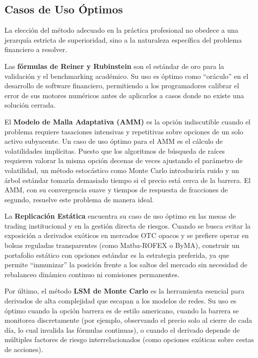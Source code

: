 \subsection{Casos de Uso Óptimos}

La elección del método adecuado en la práctica profesional no obedece a una jerarquía estricta de superioridad, sino a la naturaleza específica del problema financiero a resolver.

Las \textbf{fórmulas de Reiner y Rubinstein} son el estándar de oro para la validación y el benchmarking académico. Su uso es óptimo como ``oráculo'' en el desarrollo de software financiero, permitiendo a los programadores calibrar el error de sus motores numéricos antes de aplicarlos a casos donde no existe una solución cerrada.

El \textbf{Modelo de Malla Adaptativa (AMM)} es la opción indiscutible cuando el problema requiere tasaciones intensivas y repetitivas sobre opciones de un solo activo subyacente. Un caso de uso óptimo para el AMM es el cálculo de volatilidades implícitas. Puesto que los algoritmos de búsqueda de raíces requieren valorar la misma opción decenas de veces ajustando el parámetro de volatilidad, un método estocástico como Monte Carlo introduciría ruido y un árbol estándar tomaría demasiado tiempo si el precio está cerca de la barrera. El AMM, con su convergencia suave y tiempos de respuesta de fracciones de segundo, resuelve este problema de manera ideal.

La \textbf{Replicación Estática} encuentra su caso de uso óptimo en las mesas de trading institucional y en la gestión directa de riesgos. Cuando se busca evitar la exposición a derivados exóticos en mercados OTC opacos y se prefiere operar en bolsas reguladas transparentes (como Matba-ROFEX o ByMA), construir un portafolio estático con opciones estándar es la estrategia preferida, ya que permite ``inmunizar'' la posición frente a los saltos del mercado sin necesidad de rebalanceo dinámico continuo ni comisiones permanentes.

Por último, el método \textbf{LSM de Monte Carlo} es la herramienta esencial para derivados de alta complejidad que escapan a los modelos de redes. Su uso es óptimo cuando la opción barrera es de estilo americano, cuando la barrera se monitorea discretamente (por ejemplo, observando el precio solo al cierre de cada día, lo cual invalida las fórmulas continuas), o cuando el derivado depende de múltiples factores de riesgo interrelacionados (como opciones exóticas sobre cestas de acciones).

